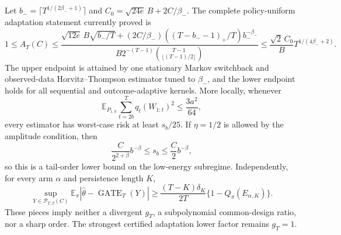 Let \(b_-=\lceil T^{1/(2\beta_-+1)}\rceil\) and \(C_0=\sqrt{24e}\,B+2C/\beta_-\). The complete policy-uniform adaptation statement currently proved is
\[
1\le A_T(C)\le
\frac{\sqrt{12e}\,B\sqrt{b_-/T}+(2C/\beta_-)((T-b_--1)_+/T)b_-^{-\beta_-}}
{B2^{-(T-1)}\binom{T-1}{\lfloor(T-1)/2\rfloor}}
\le\frac{\sqrt2\,C_0}{B}T^{1/(4\beta_-+2)}.
\]
The upper endpoint is attained by one stationary Markov switchback and observed-data Horvitz--Thompson estimator tuned to \(\beta_-\), and the lower endpoint holds for all sequential and outcome-adaptive kernels. More locally, whenever
\[
\mathbb E_{P_{1,\pi}}\sum_{t=2b}^Tq_t(W_{1:t})^2\le\frac{3a^2}{64},
\]
every estimator has worst-case risk at least \(s_b/25\). If \(\eta=1/2\) is allowed by the amplitude condition, then
\[
\frac{C}{2^{2+\beta}}b^{-\beta}\le s_b\le\frac C2b^{-\beta},
\]
so this is a tail-order lower bound on the low-energy subregime. Independently, for every arm \(\alpha\) and persistence length \(K\),
\[
\sup_{Y\in\mathcal P_{T,\beta}(C)}\mathbb E_\pi|\widehat\theta-\operatorname{GATE}_T(Y)|
\ge\frac{(T-K)\delta_K}{2T}\{1-Q_\pi(E_{\alpha,K})\}.
\]
These pieces imply neither a divergent \(g_T\), a subpolynomial common-design ratio, nor a sharp order. The strongest certified adaptation lower factor remains \(g_T=1\).